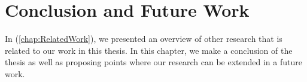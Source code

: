 {\chapter{Conclusion and Future Work}
\label{chap:Conclusion}

In (\ref{chap:RelatedWork}), we presented an overview of other research that is related to our work in this thesis. In this chapter, we make a conclusion of the thesis as well as proposing points where our research can be extended in a future work. 


}
